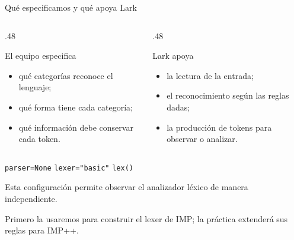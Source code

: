 \documentclass[11pt,spanish]{beamer}
\begin{document}
\begin{frame}{Qué especificamos y qué apoya Lark}
\vfill

\begin{columns}[T,onlytextwidth]
\begin{column}{.48\textwidth}
\begin{block}{El equipo especifica}
\small
\begin{itemize}
\item qué categorías reconoce el lenguaje;
\item qué forma tiene cada categoría;
\item qué información debe conservar cada token.
\end{itemize}
\end{block}
\end{column}
\begin{column}{.48\textwidth}
\begin{block}{Lark apoya}
\small
\begin{itemize}
\item la lectura de la entrada;
\item el reconocimiento según las reglas dadas;
\item la producción de tokens para observar o analizar.
\end{itemize}
\end{block}
\end{column}
\end{columns}

\bigskip

\begin{center}
\texttt{parser=None}\qquad
\texttt{lexer="basic"}\qquad
\texttt{lex()}
\end{center}

\begin{center}
\small Esta configuración permite observar el analizador léxico de manera independiente.
\end{center}

\begin{center}
\small Primero la usaremos para construir el lexer de \textsc{IMP}; la práctica extenderá sus reglas para \textsc{IMP++}.
\end{center}

\vfill
\end{frame}
\end{document}
